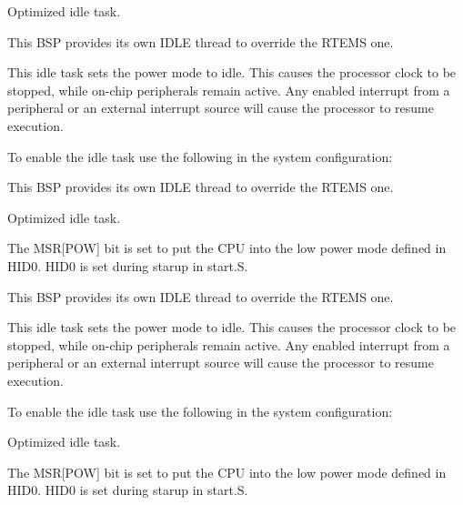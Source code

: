 Optimized idle task. 

This B\+SP provides its own I\+D\+LE thread to override the R\+T\+E\+MS one.

This idle task sets the power mode to idle. This causes the processor clock to be stopped, while on-\/chip peripherals remain active. Any enabled interrupt from a peripheral or an external interrupt source will cause the processor to resume execution.

To enable the idle task use the following in the system configuration\+:


\begin{DoxyCode}{0}
\DoxyCodeLine{\textcolor{preprocessor}{\#include <bsp.h>}}
\DoxyCodeLine{}
\DoxyCodeLine{\textcolor{preprocessor}{\#define CONFIGURE\_INIT}}
\DoxyCodeLine{}
\DoxyCodeLine{\textcolor{preprocessor}{\#define CONFIGURE\_IDLE\_TASK\_BODY bsp\_idle\_thread}}
\DoxyCodeLine{}
\end{DoxyCode}


This B\+SP provides its own I\+D\+LE thread to override the R\+T\+E\+MS one.

Optimized idle task.

The M\+SR\mbox{[}P\+OW\mbox{]} bit is set to put the C\+PU into the low power mode defined in H\+I\+D0. H\+I\+D0 is set during starup in start.\+S.

This B\+SP provides its own I\+D\+LE thread to override the R\+T\+E\+MS one.

This idle task sets the power mode to idle. This causes the processor clock to be stopped, while on-\/chip peripherals remain active. Any enabled interrupt from a peripheral or an external interrupt source will cause the processor to resume execution.

To enable the idle task use the following in the system configuration\+:


\begin{DoxyCode}{0}
\DoxyCodeLine{\textcolor{preprocessor}{\#include <bsp.h>}}
\DoxyCodeLine{}
\DoxyCodeLine{\textcolor{preprocessor}{\#define CONFIGURE\_INIT}}
\DoxyCodeLine{}
\DoxyCodeLine{\textcolor{preprocessor}{\#define CONFIGURE\_IDLE\_TASK\_BODY bsp\_idle\_thread}}
\DoxyCodeLine{}
\end{DoxyCode}


Optimized idle task.

The M\+SR\mbox{[}P\+OW\mbox{]} bit is set to put the C\+PU into the low power mode defined in H\+I\+D0. H\+I\+D0 is set during starup in start.\+S. \mbox{\label{group__RTEMSBSPsM68kUC5282_gab3388042c56b34c40be81fd5f028d97e}} 

